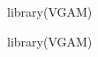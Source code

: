 \begin{Schunk}
\begin{Sinput}
 library(VGAM)
 
\end{Sinput}
\end{Schunk}
\begin{Schunk}
\begin{Sinput}
 library(VGAM)
\end{Sinput}
\end{Schunk}

